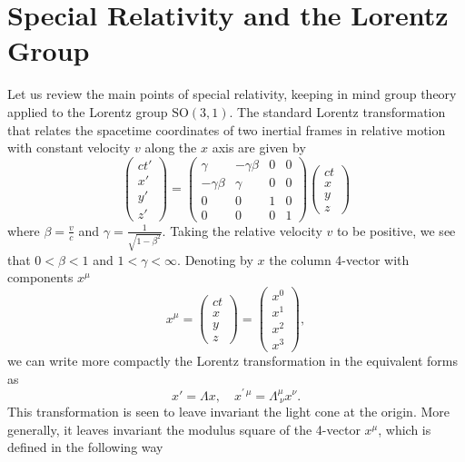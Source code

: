 \section{Special Relativity and the Lorentz Group}
Let us review the main points of special relativity, keeping in mind group theory applied to the Lorentz group \(\mathrm{SO}(3,1)\).
The standard Lorentz transformation that relates the spacetime coordinates of two inertial frames in relative motion with constant velocity $v$ along the $x$ axis are given by
\[
    \begin{pmatrix}
        ct' \\
        x'  \\
        y'  \\
        z'
    \end{pmatrix}
    =
    \begin{pmatrix}
        \gamma        & -\gamma \beta & 0 & 0 \\
        -\gamma \beta & \gamma        & 0 & 0 \\
        0             & 0             & 1 & 0 \\
        0             & 0             & 0 & 1
    \end{pmatrix}
    \begin{pmatrix}
        ct \\
        x  \\
        y  \\
        z
    \end{pmatrix}
\]
where $\beta = \frac{v}{c}$ and $\gamma = \frac{1}{\sqrt{1 - \beta^2}}$. Taking the relative velocity $v$ to be positive, we see that $0 < \beta < 1$ and $1 < \gamma < \infty$. Denoting by $x$ the column 4-vector with components $x^\mu$
\[
    x^\mu =
    \begin{pmatrix}
        ct \\
        x  \\
        y  \\
        z
    \end{pmatrix} = \begin{pmatrix}
        x^0 \\
        x^1 \\
        x^2 \\
        x^3
    \end{pmatrix},
\]
we can write more compactly the Lorentz transformation in the equivalent forms as
\[
    x' = \Lambda x, \quad x^{\prime\,\mu} = \Lambda^\mu_{\ \nu} x^\nu.
\]
This transformation is seen to leave invariant the light cone at the origin. More generally, it leaves invariant the modulus square of the 4-vector $x^\mu$, which is defined in the following way

